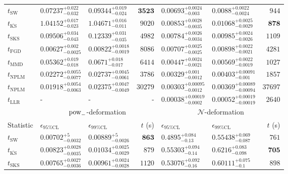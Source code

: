 \begin{tabular}{l|llr|llr}
	\midrule
	$t_{\mathrm{SW}}$ & $0.07237_{-0.032}^{+0.022}$ & $0.09344_{-0.024}^{+0.019}$ & ${\mathbf{3523}}$ & $0.00693_{-0.003}^{+0.0024}$ & $0.0088_{-0.0024}^{+0.0022}$ & $944$ \\
	$t_{\overline{\mathrm{KS}}}$ & $1.04152_{-0.023}^{+0.017}$ & $1.04671_{-0.011}^{+0.016}$ & $9020$ & $0.00853_{-0.0035}^{+0.0028}$ & $0.01068_{-0.0029}^{+0.0025}$ & ${\mathbf{878}}$ \\
	$t_{\mathrm{SKS}}$ & $0.09506_{-0.043}^{+0.034}$ & $0.12339_{-0.035}^{+0.031}$ & $4982$ & $0.00784_{-0.0034}^{+0.0026}$ & $0.00985_{-0.0026}^{+0.0024}$ & $1109$ \\
	$t_{\mathrm{FGD}}$ & ${\mathbf{0.00627_{-0.0025}^{+0.002}}}$ & ${\mathbf{0.00822_{-0.0019}^{+0.0018}}}$ & $8086$ & $0.00707_{-0.0025}^{+0.0025}$ & $0.00898_{-0.0021}^{+0.0022}$ & $4281$ \\
	$t_{\mathrm{MMD}}$ & $0.05362_{-0.018}^{+0.019}$ & $0.0671_{-0.017}^{+0.018}$ & $6414$ & ${\mathbf{0.00447_{-0.0021}^{+0.0024}}}$ & ${\mathbf{0.00569_{-0.0019}^{+0.0022}}}$ & $1027$ \\
\rowcolor{red!35}	$t_{\mathrm{NPLM}}$ & $0.02272_{-0.0077}^{+0.0055}$ & $0.02737_{-0.0061}^{+0.0045}$ & $3786$ & $0.00329_{-0.0012}^{+0.001}$ & $0.00403_{-0.001}^{+0.00091}$ & $1857$ \\
\rowcolor{blue!35}	$t_{\mathrm{NPLM}}$ & $0.01918_{-0.0063}^{+0.0054}$ & $0.02375_{-0.0049}^{+0.0047}$ & $30279$ & $0.00303_{-0.0012}^{+0.00095}$ & $0.00369_{-0.00094}^{+0.00089}$ & $37697$ \\
	$t_{\mathrm{LLR}}$ & - & - & - & $0.00038_{-0.0002}^{+0.00019}$ & $0.00052_{-0.00019}^{+0.00019}$ & $2640$ \\
	\toprule
	\multicolumn{1}{c}{} & \multicolumn{3}{c}{$\rm{pow}_{-}$-deformation} & \multicolumn{3}{c}{$\mathcal{N}$-deformation} \\
	Statistic & $\epsilon_{95\%\mathrm{CL}}$ & $\epsilon_{99\%\mathrm{CL}}$ & $t$ (s) & $\epsilon_{95\%\mathrm{CL}}$ & $\epsilon_{99\%\mathrm{CL}}$ & $t$ (s) \\
	\midrule
	$t_{\mathrm{SW}}$ & $0.00702_{-0.0032}^{+5}$ & $0.00889_{-0.0026}^{+5}$ & ${\mathbf{863}}$ & $0.4895_{-0.13}^{+0.084}$ & $0.55438_{-0.087}^{+0.069}$ & $761$ \\
	$t_{\overline{\mathrm{KS}}}$ & $0.00823_{-0.0035}^{+0.0028}$ & $0.01034_{-0.0029}^{+0.0025}$ & $879$ & $0.55303_{-0.14}^{+0.094}$ & $0.6216_{-0.098}^{+0.083}$ & ${\mathbf{705}}$ \\
	$t_{\mathrm{SKS}}$ & $0.00765_{-0.0036}^{+0.0027}$ & $0.00961_{-0.0028}^{+0.0024}$ & $1120$ & $0.53076_{-0.16}^{+0.092}$ & $0.60111_{-0.1}^{+0.075}$ & $898$ \\

\end{tabular}
